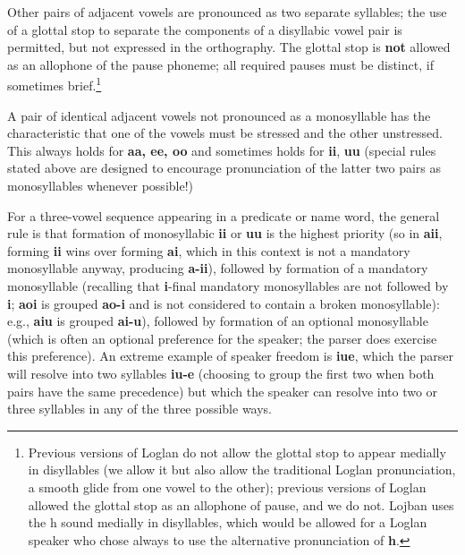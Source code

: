 \documentclass[12pt]{book}
\begin{document}
Other pairs of adjacent vowels are pronounced as two separate syllables;  the use of a glottal stop to separate the components of a disyllabic vowel pair is permitted, but not expressed in the orthography.  The glottal stop is {\bf not} allowed as an allophone of the pause phoneme;  all required pauses must be distinct, if sometimes brief.\footnote{Previous versions of Loglan do not allow the glottal stop to appear medially in disyllables (we allow it but also allow the traditional Loglan pronunciation, a smooth glide from one vowel to the other);  previous versions of Loglan allowed the glottal stop as an allophone of pause, and we do not.  Lojban uses the h sound medially in disyllables, which would be allowed for a Loglan speaker who chose always to use the alternative pronunciation of {\bf h}.}

A pair of identical adjacent vowels not pronounced as a monosyllable has the characteristic that one of the vowels must be stressed and the other unstressed.  This always holds for
{\bf aa, ee, oo} and sometimes holds for {\bf ii}, {\bf uu} (special rules stated above are designed to encourage pronunciation of the latter two pairs as monosyllables whenever possible!)

For a three-vowel sequence appearing in a predicate or name word, the general rule is that formation of monosyllabic
{\bf ii} or {\bf uu} is the highest priority (so in {\bf aii}, forming {\bf ii} wins over forming {\bf ai}, which in this context is not a mandatory monosyllable anyway, producing {\bf a-ii}), followed by formation of a mandatory monosyllable (recalling that {\bf i}-final mandatory monosyllables are not followed by {\bf i}; {\bf aoi} is grouped {\bf ao-i} and is not considered to contain a broken monosyllable):  e.g.,  {\bf aiu} is grouped {\bf ai-u}), followed by formation of an optional monosyllable (which is often an optional preference for the speaker;  the parser does exercise this preference).  An extreme example of speaker freedom is {\bf iue}, which the parser will resolve into two syllables {\bf iu-e} (choosing to group the first two when both pairs have the same precedence)  but which the speaker can resolve into two or three syllables in any of the three possible ways.
\end{document}
